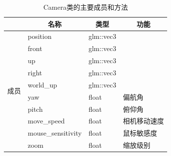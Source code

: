 \begin{table}[htb]
	\centering
	\caption{Camera类的主要成员和方法}
	\label{table:Camera}
	\begin{tabular}{|l|m{4cm}|m{3cm}|m{5cm}|}
		\hline
		                     & \multicolumn{1}{c|}{名称}                        & \multicolumn{1}{c|}{类型}             & \multicolumn{1}{c|}{功能}                         \\ \hline
		\multirow{10}{*}{成员} & \centering\arraybackslash position             & \centering\arraybackslash glm::vec3 & \centering\arraybackslash \multirow{5}{*}{相机位姿} \\ \cline{2-3}
		                     & \centering\arraybackslash front                & \centering\arraybackslash glm::vec3 &                                                 \\ \cline{2-3}
		                     & \centering\arraybackslash up                   & \centering\arraybackslash glm::vec3 &                                                 \\ \cline{2-3}
		                     & \centering\arraybackslash right                & \centering\arraybackslash glm::vec3 &                                                 \\ \cline{2-3}
		                     & \centering\arraybackslash world\_up            & \centering\arraybackslash glm::vec3 &                                                 \\ \cline{2-4}
		                     & \centering\arraybackslash yaw                  & \centering\arraybackslash float     & \centering\arraybackslash 偏航角                   \\ \cline{2-4}
		                     & \centering\arraybackslash pitch                & \centering\arraybackslash float     & \centering\arraybackslash 俯仰角                   \\ \cline{2-4}
		                     & \centering\arraybackslash move\_speed          & \centering\arraybackslash float     & \centering\arraybackslash 相机移动速度                \\ \cline{2-4}
		                     & \centering\arraybackslash mouse\_sensitivity   & \centering\arraybackslash float     & \centering\arraybackslash 鼠标敏感度                 \\ \cline{2-4}
		                     & \centering\arraybackslash zoom                 & \centering\arraybackslash float     & \centering\arraybackslash 缩放级别                  \\ \hline

\end{tabular}
\end{table}
